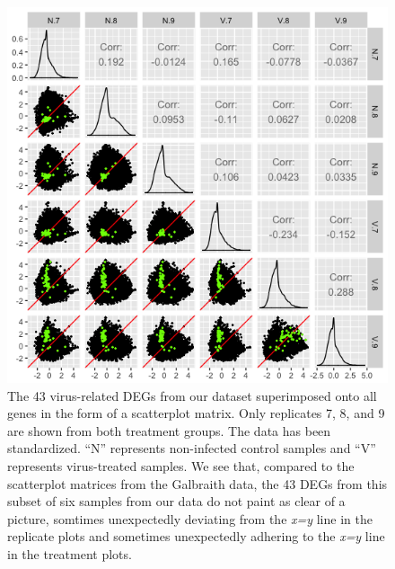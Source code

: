 \documentclass[11pt,a4paper,oldfontcommands,openany]{memoir}
\numberwithin{equation}{section} %
\begin{document}
\begin{figure}[H]
  \includegraphics[width=\textwidth]{Images/RutterSM3}
  \caption{The 43 virus-related DEGs from our dataset superimposed onto all genes in the form of a scatterplot matrix. Only replicates 7, 8, and 9 are shown from both treatment groups. The data has been standardized. ``N'' represents non-infected control samples and ``V'' represents virus-treated samples. We see that, compared to the scatterplot matrices from the Galbraith data, the 43 DEGs from this subset of six samples from our data do not paint as clear of a picture, somtimes unexpectedly deviating from the \textit{x=y} line in the replicate plots and sometimes unexpectedly adhering to the \textit{x=y} line in the treatment plots.}
  \label{fig:RutterSM3}
\end{figure}
\end{document}
